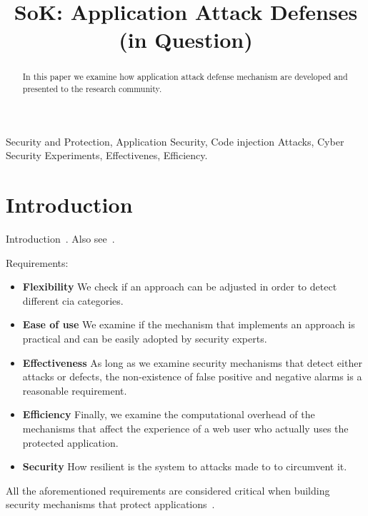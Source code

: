 \documentclass[conference]{IEEEtran}
\date{}
\begin{document}
\author{
}

\title{SoK: Application Attack Defenses (in Question)}

\maketitle
\begin{abstract}
In this paper we examine how application attack defense
mechanism are developed and presented to
the research community.
\end{abstract}

\begin{IEEEkeywords}
Security and Protection, Application Security, Code injection Attacks, Cyber Security Experiments, Effectivenes, Efficiency.
\end{IEEEkeywords}

\IEEEpeerreviewmaketitle

\section{Introduction}

Introduction~\cite{I05}. Also see~\cite{A00}.

Requirements:
\begin{itemize}
\item {\bf Flexibility} We check if an approach
can be adjusted in order to detect different {\sc cia} categories.
\item {\bf Ease of use} We examine if the mechanism that
implements an approach is practical and can be easily adopted
by security experts.
\item {\bf Effectiveness} As long as we examine security
mechanisms that detect either attacks or defects,
the non-existence of false positive and negative alarms
is a reasonable requirement.
\item {\bf Efficiency} Finally, we examine
the computational overhead of the mechanisms that affect the experience of
a web user who actually uses the protected application.
\item {\bf Security} How resilient is the system to
attacks made to to circumvent it.
\end{itemize}
All the aforementioned requirements are considered critical
when building security mechanisms that protect
applications~\cite{A01,A00}.
\end{document}
